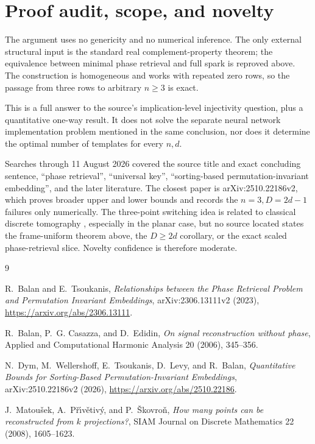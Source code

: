 \documentclass[11pt]{article}
\begin{document}
\section{Proof audit, scope, and novelty}

The argument uses no genericity and no numerical inference.  The only
external structural input is the standard real complement-property theorem;
the equivalence between minimal phase retrieval and full spark is reproved
above.  The construction is homogeneous and works with repeated zero rows,
so the passage from three rows to arbitrary \(n\ge3\) is exact.

This is a full answer to the source's implication-level injectivity question,
plus a quantitative one-way result.  It does not solve the separate neural
network implementation problem mentioned in the same conclusion, nor does it
determine the optimal number of templates for every \(n,d\).

Searches through 11 August 2026 covered the source title and exact concluding
sentence, ``phase retrieval'', ``universal key'', ``sorting-based
permutation-invariant embedding'', and the later literature.  The closest
paper is arXiv:2510.22186v2, which proves broader upper and lower bounds and
records the \(n=3,D=2d-1\) failures only numerically.  The three-point
switching idea is related to classical discrete tomography
\cite{MPS}, especially in the planar case, but no source located states the
frame-uniform theorem above, the \(D\ge2d\) corollary, or the exact scaled
phase-retrieval slice.  Novelty confidence is therefore moderate.

\begin{thebibliography}{9}

R.~Balan and E.~Tsoukanis,
\emph{Relationships between the Phase Retrieval Problem and Permutation
Invariant Embeddings},
arXiv:2306.13111v2 (2023),
\url{https://arxiv.org/abs/2306.13111}.

R.~Balan, P.~G. Casazza, and D.~Edidin,
\emph{On signal reconstruction without phase},
Applied and Computational Harmonic Analysis 20 (2006), 345--356.

N.~Dym, M.~Wellershoff, E.~Tsoukanis, D.~Levy, and R.~Balan,
\emph{Quantitative Bounds for Sorting-Based Permutation-Invariant Embeddings},
arXiv:2510.22186v2 (2026),
\url{https://arxiv.org/abs/2510.22186}.

J.~Matou\v{s}ek, A.~P\v{r}\'{\i}v\v{e}tiv\'y, and P.~\v{S}kovro\v{n},
\emph{How many points can be reconstructed from \(k\) projections?},
SIAM Journal on Discrete Mathematics 22 (2008), 1605--1623.

\end{thebibliography}
\end{document}
